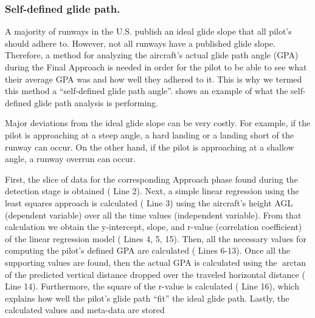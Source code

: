         
        \subsubsection{Self-defined glide path.}
        
        	A majority of runways in the U.S. publish an ideal glide slope that all pilot's should adhere to.  However, not all runways have a published glide slope.  Therefore, a method for analyzing the aircraft's actual glide path angle (GPA) during the Final Approach is needed in order for the pilot to be able to see what their average GPA was and how well they adhered to it.  This is why we termed this method a ``self-defined glide path angle''.   shows an example of what the self-defined glide path analysis is performing.
            
            Major deviations from the ideal glide slope can be very costly.  For example, if the pilot is approaching at a steep angle, a hard landing or a landing short of the runway can occur.  On the other hand, if the pilot is approaching at a shallow angle, a runway overrun can occur.
            
            First, the slice of data for the corresponding Approach phase found during the detection stage is obtained ( Line 2).  Next, a simple linear regression using the least squares approach is calculated ( Line 3) using the aircraft's height AGL (dependent variable) over all the time values (independent variable).  From that calculation we obtain the y-intercept, slope, and r-value (correlation coefficient) of the linear regression model ( Lines 4, 5, 15).  Then, all the necessary values for computing the pilot's defined GPA are calculated ( Lines 6-13).  Once all the supporting values are found, then the actual GPA is calculated using the $\arctan$ of the predicted vertical distance dropped over the traveled horizontal distance ( Line 14).  Furthermore, the square of the r-value is calculated ( Line 16), which explains how well the pilot's glide path ``fit'' the ideal glide path.  Lastly, the calculated values and meta-data are stored
            
